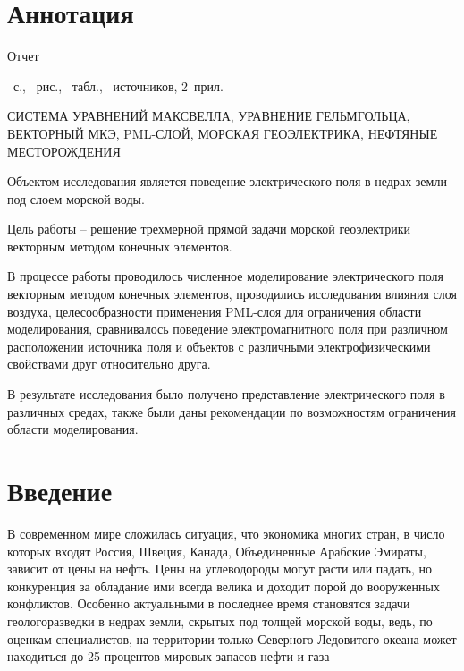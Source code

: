 \documentclass[a4paper,14pt]{article}
\begin{document}
\setcounter{page}{3}


	\clearpage
	\section*{Аннотация}

	Отчет \begin{NoHyper}{\pageref{LastPage}}\end{NoHyper}~с., ~рис., ~табл., ~источников, 2~прил.

	СИСТЕМА УРАВНЕНИЙ МАКСВЕЛЛА, УРАВНЕНИЕ ГЕЛЬМГОЛЬЦА, ВЕКТОРНЫЙ МКЭ, PML-СЛОЙ, МОРСКАЯ ГЕОЭЛЕКТРИКА, НЕФТЯНЫЕ МЕСТОРОЖДЕНИЯ

	Объектом исследования является поведение электрического поля в недрах земли под слоем морской воды.

	Цель работы -- решение трехмерной прямой задачи морской геоэлектрики векторным методом конечных элементов.

	В процессе работы проводилось численное моделирование электрического поля векторным методом конечных элементов, проводились исследования влияния слоя воздуха, целесообразности применения PML-слоя для ограничения области моделирования, сравнивалось поведение электромагнитного поля при различном расположении источника поля и объектов с различными электрофизическими свойствами друг относительно друга.

	В результате исследования было получено представление электрического поля в различных средах, также были даны рекомендации по возможностям ограничения области моделирования.

\setcounter{page}{4}


\clearpage
\tableofcontents


\clearpage
{}
\section*{Введение}

В современном мире сложилась ситуация, что экономика многих стран, в число которых входят Россия, Швеция, Канада, Объединенные Арабские Эмираты, зависит от цены на нефть. Цены на углеводороды могут расти или падать, но конкуренция за обладание ими всегда велика и доходит порой до вооруженных конфликтов. Особенно актуальными в последнее время становятся задачи геологоразведки в недрах земли, скрытых под толщей морской воды, ведь, по оценкам специалистов, на территории только Северного Ледовитого океана может находиться до 25 процентов мировых запасов нефти и газа~\citep{shurina}
\end{document}
